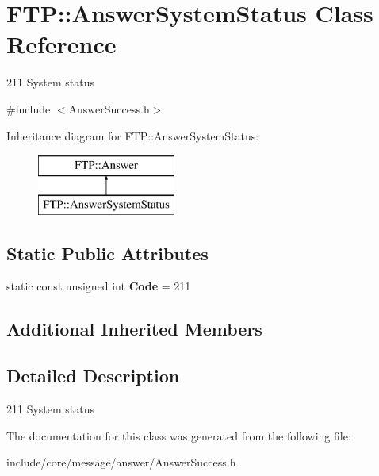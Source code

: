 \hypertarget{class_f_t_p_1_1_answer_system_status}{\section{F\-T\-P\-:\-:Answer\-System\-Status Class Reference}
\label{class_f_t_p_1_1_answer_system_status}
}


211 System status  




{\ttfamily \#include $<$Answer\-Success.\-h$>$}

Inheritance diagram for F\-T\-P\-:\-:Answer\-System\-Status\-:\begin{figure}[H]
\begin{center}
\leavevmode
\includegraphics[height=2.000000cm]{class_f_t_p_1_1_answer_system_status}
\end{center}
\end{figure}
\subsection*{Static Public Attributes}
\begin{DoxyCompactItemize}
\item 
\hypertarget{class_f_t_p_1_1_answer_system_status_abb133d330c4bffaab044b3300ed49a65}{static const unsigned int {\bfseries Code} = 211}\label{class_f_t_p_1_1_answer_system_status_abb133d330c4bffaab044b3300ed49a65}

\end{DoxyCompactItemize}
\subsection*{Additional Inherited Members}


\subsection{Detailed Description}
211 System status 

The documentation for this class was generated from the following file\-:\begin{DoxyCompactItemize}
\item 
include/core/message/answer/Answer\-Success.\-h\end{DoxyCompactItemize}

